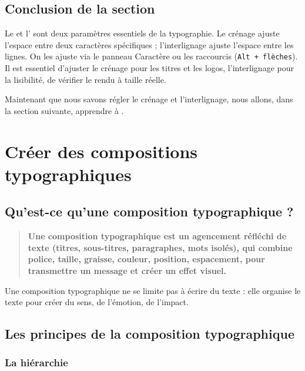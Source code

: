 \subsection*{Conclusion de la section}

Le  et l' sont deux paramètres essentiels de la typographie. Le crénage ajuste l'espace entre deux caractères spécifiques ; l'interlignage ajuste l'espace entre les lignes. On les ajuste via le panneau Caractère ou les raccourcis (\texttt{Alt + flèches}). Il est essentiel d'ajuster le crénage pour les titres et les logos, l'interlignage pour la lisibilité, de vérifier le rendu à taille réelle.

Maintenant que nous savons régler le crénage et l'interlignage, nous allons, dans la section suivante, apprendre à .

\section{Créer des compositions typographiques}

\subsection{Qu'est-ce qu'une composition typographique ?}

\begin{quote}
\textbf{Une composition typographique est un agencement réfléchi de texte (titres, sous-titres, paragraphes, mots isolés), qui combine police, taille, graisse, couleur, position, espacement, pour transmettre un message et créer un effet visuel.}
\end{quote}

Une composition typographique ne se limite pas à écrire du texte : elle organise le texte pour créer du sens, de l'émotion, de l'impact.

\subsection{Les principes de la composition typographique}

\subsubsection{La hiérarchie}


